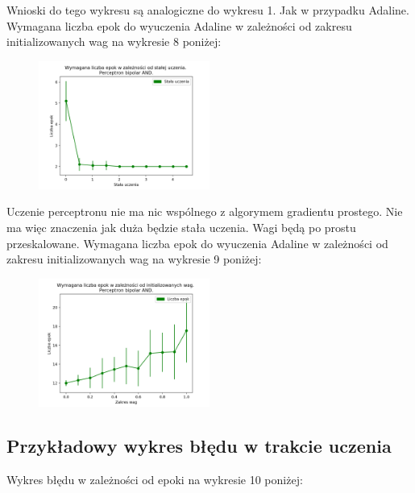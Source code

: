 \documentclass{article}
\begin{document}
Wnioski do tego wykresu są analogiczne do wykresu 1. Jak w przypadku Adaline.\\[0.5cm]

	Wymagana liczba epok do wyuczenia Adaline w zależności od zakresu initializowanych wag na wykresie 8 poniżej:
	
	\begin{figure}[h]

		\centering
		\caption{}
		\includegraphics[width=0.5\textwidth]{epoki_rate_perceptron_bipolar.png}
		
	\end{figure}  
	Uczenie perceptronu nie ma nic wspólnego z algorymem gradientu prostego. Nie ma więc znaczenia jak duża będzie stała uczenia. Wagi będą po prostu przeskalowane.
		\newpage
	Wymagana liczba epok do wyuczenia Adaline w zależności od zakresu initializowanych wag na wykresie 9 poniżej:
	
	\begin{figure}[h]

		\centering
		\caption{}
		\includegraphics[width=0.5\textwidth]{epoki_wagi_perceptron_bipolar.png}
		
	\end{figure}   
	
	\subsection{Przykładowy wykres błędu w trakcie uczenia}
	Wykres błędu w zależności od epoki na wykresie 10 poniżej:
	
\end{document}
